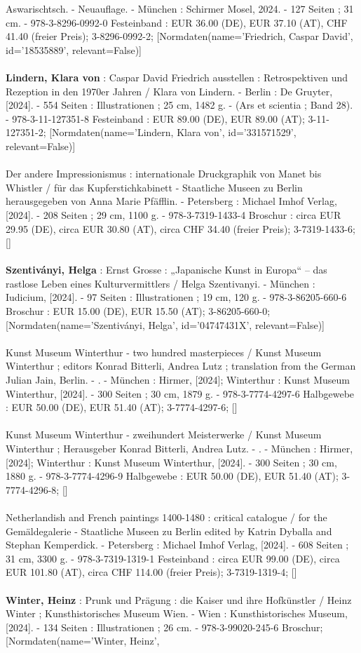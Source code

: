 \documentclass{article}
\begin{document}
\begin{multicols}{3}
Aswarischtsch. - Neuauflage. - München : Schirmer Mosel, 2024. - 127 Seiten ; 31 cm. - 978-3-8296-0992-0 Festeinband : EUR 36.00 (DE), EUR 37.10 (AT), CHF 41.40 (freier Preis); 3-8296-0992-2; [Normdaten(name='Friedrich, Caspar David', id='18535889', relevant=False)]\\\\\textbf{Lindern, Klara von} : Caspar David Friedrich ausstellen : Retrospektiven und Rezeption in den 1970er Jahren / Klara von Lindern. - Berlin : De Gruyter, [2024]. - 554 Seiten : Illustrationen ; 25 cm, 1482 g. - (Ars et scientia ; Band 28). - 978-3-11-127351-8 Festeinband : EUR 89.00 (DE), EUR 89.00 (AT); 3-11-127351-2; [Normdaten(name='Lindern, Klara von', id='331571529', relevant=False)]\\\\Der andere Impressionismus : internationale Druckgraphik von Manet bis Whistler / für das Kupferstichkabinett - Staatliche Museen zu Berlin herausgegeben von Anna Marie Pfäfflin. - Petersberg : Michael Imhof Verlag, [2024]. - 208 Seiten ; 29 cm, 1100 g. - 978-3-7319-1433-4 Broschur : circa EUR 29.95 (DE), circa EUR 30.80 (AT), circa CHF 34.40 (freier Preis); 3-7319-1433-6; []\\\\\textbf{Szentiványi, Helga} : Ernst Grosse : „Japanische Kunst in Europa“ – das rastlose Leben eines Kulturvermittlers / Helga Szentivanyi. - München : Iudicium, [2024]. - 97 Seiten : Illustrationen ; 19 cm, 120 g. - 978-3-86205-660-6 Broschur : EUR 15.00 (DE), EUR 15.50 (AT); 3-86205-660-0; [Normdaten(name='Szentiványi, Helga', id='04747431X', relevant=False)]\\\\Kunst Museum Winterthur - two hundred masterpieces / Kunst Museum Winterthur ; editors Konrad Bitterli, Andrea Lutz ; translation from the German Julian Jain, Berlin. - . - München : Hirmer, [2024]; Winterthur : Kunst Museum Winterthur, [2024]. - 300 Seiten ; 30 cm, 1879 g. - 978-3-7774-4297-6 Halbgewebe : EUR 50.00 (DE), EUR 51.40 (AT); 3-7774-4297-6; []\\\\Kunst Museum Winterthur - zweihundert Meisterwerke / Kunst Museum Winterthur ; Herausgeber Konrad Bitterli, Andrea Lutz. - . - München : Hirmer, [2024]; Winterthur : Kunst Museum Winterthur, [2024]. - 300 Seiten ; 30 cm, 1880 g. - 978-3-7774-4296-9 Halbgewebe : EUR 50.00 (DE), EUR 51.40 (AT); 3-7774-4296-8; []\\\\Netherlandish and French paintings 1400-1480 : critical catalogue / for the Gemäldegalerie - Staatliche Museen zu Berlin edited by Katrin Dyballa and Stephan Kemperdick. - Petersberg : Michael Imhof Verlag, [2024]. - 608 Seiten ; 31 cm, 3300 g. - 978-3-7319-1319-1 Festeinband : circa EUR 99.00 (DE), circa EUR 101.80 (AT), circa CHF 114.00 (freier Preis); 3-7319-1319-4; []\\\\\textbf{Winter, Heinz} : Prunk und Prägung : die Kaiser und ihre Hofkünstler / Heinz Winter ; Kunsthistorisches Museum Wien. - Wien : Kunsthistorisches Museum, [2024]. - 134 Seiten : Illustrationen ; 26 cm. - 978-3-99020-245-6 Broschur; [Normdaten(name='Winter, Heinz', 
\end{multicols}
\end{document}
